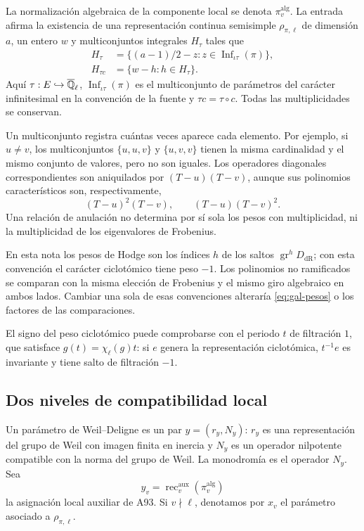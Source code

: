 La normalización algebraica de la componente local se denota
$\pi_v^{\mathrm{alg}}$. La entrada afirma la existencia de una
representación continua semisimple $\rho_{\pi,\ell}$ de dimensión $a$,
un entero $w$ y multiconjuntos integrales $H_\tau$ tales que
\begin{equation}
 \begin{split}
 H_\tau&=\{(a-1)/2-z:
                  z\in\operatorname{Inf}_{\iota\tau}(\pi)\},\\
 H_{\tau c}&=\{w-h:h\in H_\tau\}.
 \end{split}
 \label{eq:gal-pesos}
\end{equation}
Aquí $\tau:E\hookrightarrow\overline{\mathbb{Q}}_\ell$,
$\operatorname{Inf}_{\iota\tau}(\pi)$ es el multiconjunto de
parámetros del carácter infinitesimal en la convención de la fuente
y $\tau c=\tau\circ c$. Todas las multiplicidades se conservan.

Un multiconjunto registra cuántas veces aparece cada elemento.
Por ejemplo, si $u\ne v$, los multiconjuntos
$\{u,u,v\}$ y $\{u,v,v\}$ tienen la misma cardinalidad y el mismo
conjunto de valores, pero no son iguales. Los operadores diagonales
correspondientes son aniquilados por $(T-u)(T-v)$, aunque sus
polinomios característicos son, respectivamente,
\begin{equation}
 (T-u)^2(T-v),\qquad (T-u)(T-v)^2.
 \label{eq:gal-multiplicidades}
\end{equation}
Una relación de anulación no determina por sí sola los pesos
con multiplicidad, ni la multiplicidad de los eigenvalores de Frobenius.

En esta nota los pesos de Hodge son los índices $h$ de los saltos
$\operatorname{gr}^h D_{\mathrm{dR}}$; con esta convención el carácter
ciclotómico tiene peso $-1$. Los polinomios no ramificados se
comparan con la misma elección de Frobenius y el mismo giro
algebraico en ambos lados. Cambiar una sola de esas convenciones
alteraría \eqref{eq:gal-pesos} o los factores de las comparaciones.

El signo del peso ciclotómico puede comprobarse con el periodo
$t$ de filtración $1$, que satisface $g(t)=\chi_\ell(g)t$:
si $e$ genera la representación ciclotómica, $t^{-1}e$ es
invariante y tiene salto de filtración $-1$.

\subsection{Dos niveles de compatibilidad local}

Un parámetro de Weil--Deligne es un par $y=(r_y,N_y)$:
$r_y$ es una representación del grupo de Weil con imagen finita
en inercia y $N_y$ es un operador nilpotente compatible con
la norma del grupo de Weil. La monodromía es el operador $N_y$.
Sea
\[
 y_v=\operatorname{rec}^{\mathrm{aux}}_v(\pi_v^{\mathrm{alg}})
\]
la asignación local auxiliar de A93. Si $v\nmid\ell$, denotamos
por $x_v$ el parámetro asociado a $\rho_{\pi,\ell}$.

